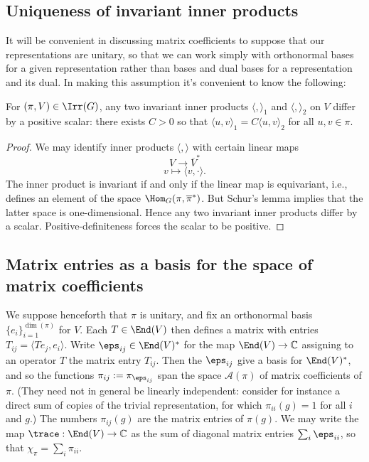 \documentclass[reqno]{amsart} 
\begin{document}
\subsection{Uniqueness of invariant inner products}\label{sec:cnh2vooicg}
It will be convenient in discussing matrix coefficients to suppose that our representations are unitary, so that we can work simply with orthonormal bases for a given representation rather than bases and dual bases for a representation and its dual.  In making this assumption it's convenient to know the following:
\begin{lemma}
  For $(\pi,V) \in \Irr(G)$, any two invariant inner products $\langle , \rangle_1$ and $\langle , \rangle_2$ on $V$ differ by a positive scalar: there exists $C > 0$ so that $\langle u,v \rangle_1 = C \langle u,v \rangle_2$ for all $u,v \in \pi$.
\end{lemma}
\begin{proof}
  We may identify inner products $\langle , \rangle$ with certain linear maps
  \begin{equation*}
    V \rightarrow \overline{V}^*
  \end{equation*}
  \begin{equation*}
    v \mapsto \langle v, \cdot \rangle.
  \end{equation*}
  The inner product is invariant if and only if the linear map is equivariant, i.e., defines an element of the space $\Hom_G(\pi, \overline{\pi }^*)$.  But Schur's lemma implies that the latter space is one-dimensional.  Hence any two invariant inner products differ by a scalar.  Positive-definiteness forces the scalar to be positive.
\end{proof}

\subsection{Matrix entries as a basis
  for the space of matrix coefficients}
We suppose henceforth that $\pi$ is unitary, and fix an orthonormal basis $\{e_i\}_{i=1}^{\dim(\pi)}$ for $V$.  Each $T \in \End(V)$ then defines a matrix with entries $T_{i j} = \langle T e_j, e_i \rangle$.  Write $\eps_{i j} \in \End(V)^*$ for the map $\End(V) \rightarrow \mathbb{C}$ assigning to an operator $T$ the matrix entry $T_{i j}$.  Then the $\eps_{i j}$ give a basis for $\End(V)^*$, and so the functions $\pi_{i j} := \pi_{\eps_{i j}}$ span the space $\mathcal{A}(\pi)$ of matrix coefficients of $\pi$.  (They need not in general be linearly independent: consider for instance a direct sum of copies of the trivial representation, for which $\pi_{i i}(g) = 1$ for all $i$ and $g$.)  The numbers $\pi_{i j}(g)$ are the matrix entries of $\pi(g)$.  We may write the map $\trace : \End(V) \rightarrow \mathbb{C}$ as the sum of diagonal matrix entries $\sum_i \eps_{i i}$, so that $\chi_\pi = \sum_i \pi_{i i}$.
\end{document}
